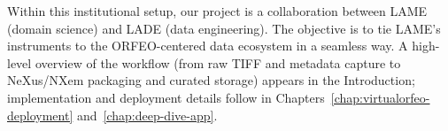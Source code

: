 \medskip
\noindent Within this institutional setup, our project is a collaboration between LAME (domain science) and LADE (data engineering). The objective is to tie LAME’s instruments to the ORFEO-centered data ecosystem in a seamless way. A high-level overview of the workflow (from raw TIFF and metadata capture to NeXus/NXem packaging and curated storage) appears in the Introduction; implementation and deployment details follow in Chapters~\ref{chap:virtualorfeo-deployment} and~\ref{chap:deep-dive-app}.
